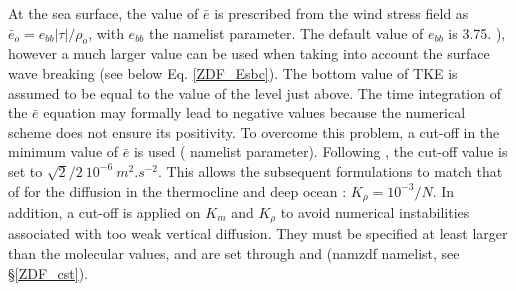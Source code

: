 \documentclass[NEMO_book]{subfiles}
\begin{document}
At the sea surface, the value of $\bar{e}$ is prescribed from the wind 
stress field as $\bar{e}_o = e_{bb} |\tau| / \rho_o$, with $e_{bb}$ the  
namelist parameter. The default value of $e_{bb}$ is 3.75. \citep{Gaspar1990}), 
however a much larger value can be used when taking into account the 
surface wave breaking (see below Eq. \eqref{ZDF_Esbc}). 
The bottom value of TKE is assumed to be equal to the value of the level just above. 
The time integration of the $\bar{e}$ equation may formally lead to negative values 
because the numerical scheme does not ensure its positivity. To overcome this 
problem, a cut-off in the minimum value of $\bar{e}$ is used ( 
namelist parameter). Following \citet{Gaspar1990}, the cut-off value is set 
to $\sqrt{2}/2~10^{-6}~m^2.s^{-2}$. This allows the subsequent formulations 
to match that of \citet{Gargett1984} for the diffusion in the thermocline and 
deep ocean :  $K_\rho = 10^{-3} / N$. 
In addition, a cut-off is applied on $K_m$ and $K_\rho$ to avoid numerical 
instabilities associated with too weak vertical diffusion. They must be 
specified at least larger than the molecular values, and are set through 
 and  (namzdf namelist, see \S\ref{ZDF_cst}).
\end{document}

